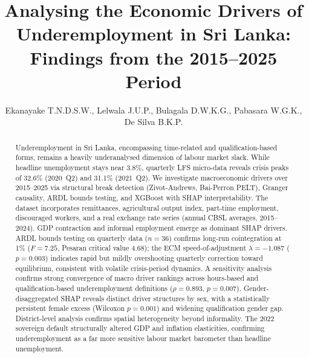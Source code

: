 \documentclass[sigconf]{acmart}
\begin{document}
\title{Analysing the Economic Drivers of Underemployment in Sri Lanka: Findings from the 2015--2025 Period}

\author{
Ekanayake T.N.D.S.W.,
Lelwala J.U.P.,
Bulagala D.W.K.G.,
Pabasara W.G.K.,
De Silva B.K.P.
}



\begin{abstract}
Underemployment in Sri Lanka, encompassing time-related and
qualification-based forms, remains a heavily underanalysed dimension of
labour market slack. While headline unemployment stays near 3.8\%, quarterly
LFS micro-data reveals crisis peaks of 32.6\% (2020~Q2) and 31.1\%
(2021~Q2). We investigate macroeconomic drivers over 2015--2025 via
structural break detection (Zivot-Andrews, Bai-Perron PELT), Granger
causality, ARDL bounds testing, and XGBoost with SHAP interpretability.
The dataset incorporates remittances, agricultural output index,
part-time employment, discouraged workers, and a real exchange rate series
(annual CBSL averages, 2015--2024). GDP contraction and informal employment
emerge as dominant SHAP drivers. ARDL bounds testing on quarterly data
($n{=}36$) confirms long-run cointegration at 1\% ($F{=}7.25$, Pesaran
critical value 4.68); the ECM speed-of-adjustment $\lambda{=}{-1.087}$
($p{=}0.003$) indicates rapid but mildly overshooting quarterly correction toward
equilibrium, consistent with volatile crisis-period dynamics. A sensitivity analysis confirms strong convergence of macro
driver rankings across hours-based and qualification-based underemployment
definitions ($\rho = 0.893$, $p = 0.007$). Gender-disaggregated SHAP
reveals distinct driver structures by sex, with a statistically persistent
female excess (Wilcoxon $p = 0.001$) and widening qualification gender gap.
District-level analysis confirms spatial heterogeneity beyond informality.
The 2022 sovereign default structurally altered GDP and inflation
elasticities, confirming underemployment as a far more sensitive labour
market barometer than headline unemployment.
\end{abstract}

\end{document}
